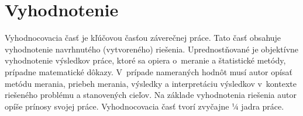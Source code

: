 
\chapter{Vyhodnotenie}\label{ch:evaluation}

Vyhodnocovacia časť je kľúčovou časťou záverečnej práce. Tato časť obsahuje vyhodnotenie navrhnutého (vytvoreného) riešenia. Uprednostňované je objektívne vyhodnotenie výsledkov práce, ktoré sa opiera o~meranie a štatistické metódy, prípadne matematické dôkazy. V~prípade nameraných hodnôt musí autor opísať metódu merania, priebeh merania, výsledky a interpretáciu výsledkov v~kontexte riešeného problému a stanovených cieľov. Na základe vyhodnotenia riešenia autor opíše prínosy svojej práce. Vyhodnocovacia časť tvorí zvyčajne ¼ jadra práce.
